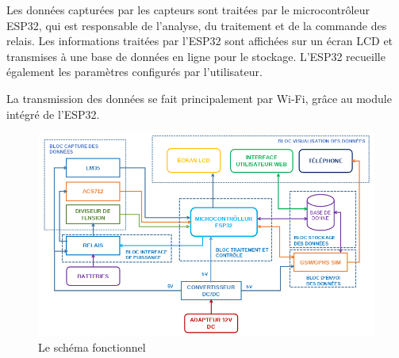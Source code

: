 Les données capturées par les capteurs sont traitées par le microcontrôleur ESP32, qui est responsable de l'analyse, du traitement et de la commande des relais. Les informations traitées par l'ESP32 sont affichées sur un écran LCD et transmises à une base de données en ligne pour le stockage. L'ESP32 recueille également les paramètres configurés par l'utilisateur.

La transmission des données se fait principalement par Wi-Fi, grâce au module intégré de l'ESP32.

\begin{figure}[H]
	\centering
	\includegraphics[width=17cm]{./img/composants/SCHEMAFONCTIONNEL.png}
	\caption{Le schéma fonctionnel}
	\label{fig:relais_5vdc}
\end{figure}






